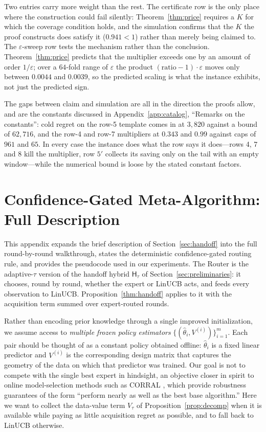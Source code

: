 \documentclass{article}
\theoremstyle{definition}
\theoremstyle{remark}
\newcommand{\eps}{\varepsilon}
\theoremstyle{remark}
\newcommand{\Hyb}{\mathsf{H}}
\begin{document}
Two entries carry more weight than the rest. The certificate row is the only
place where the construction could fail silently: Theorem~\ref{thm:price}
requires a $K$ for which the coverage condition holds, and the simulation
confirms that the $K$ the proof constructs does satisfy it
($0.941<1$) rather than merely being claimed to. The $\eps$-sweep row tests the
mechanism rather than the conclusion. Theorem~\ref{thm:price} predicts that
the multiplier exceeds one by an amount of order $1/\eps$; over a $64$-fold
range of $\eps$ the product $(\text{ratio}-1)\cdot\eps$ moves only between
$0.0044$ and $0.0039$, so the predicted scaling is what the instance exhibits,
not just the predicted sign.

The gaps between claim and simulation are all in the direction the proofs
allow, and are the constants discussed in
Appendix~\ref{app:catalog}, ``Remarks on the constants'': cold regret on the
row-5 template comes in at $3{,}820$ against a bound of $62{,}716$, and the
row-4 and row-7 multipliers at $0.343$ and $0.99$ against caps of $961$ and
$65$. In every case the instance does what the row says it does---rows 4, 7
and 8 kill the multiplier, row $5'$ collects its saving only on the tail with
an empty window---while the numerical bound is loose by the stated constant
factors.

\section{Confidence-Gated Meta-Algorithm: Full Description}
\label{app:meta-algorithm}

This appendix expands the brief description of
Section~\ref{sec:handoff} into the full round-by-round walkthrough,
states the deterministic confidence-gated routing rule, and provides
the pseudocode used in our experiments. The Router is the adaptive-$\tau$ version of the handoff hybrid
$\Hyb_\tau$ of Section~\ref{sec:preliminaries}: it chooses, round by round,
whether the expert or LinUCB acts, and feeds every observation to LinUCB.
Proposition~\ref{thm:handoff} applies to it with the acquisition term summed over
expert-routed rounds.

Rather than encoding prior knowledge through a single improved
initialization, we assume access to \emph{multiple frozen policy
estimators} $\{(\widehat\theta_i,V^{(i)})\}_{i=1}^m$. Each pair should
be thought of as a constant policy obtained offline:
$\widehat\theta_i$ is a fixed linear predictor and $V^{(i)}$ is the
corresponding design matrix that captures the geometry of the data on
which that predictor was trained. Our goal is not to compete with the
single best expert in hindsight, an objective closer in spirit to
online model-selection methods such as CORRAL
\cite{agarwal2017corralling,chen2024llmdecision}, which provide
robustness guarantees of the form ``perform nearly as well as the best
base algorithm.'' Here we want to collect the data-value term $V_\tau$ of
Proposition~\ref{prop:decomp} when it is available while paying as little
acquisition regret as possible, and to fall back to LinUCB otherwise.
\end{document}
